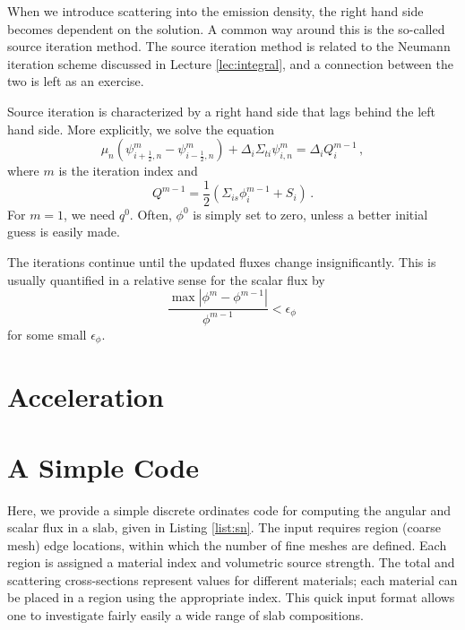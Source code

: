 When we introduce scattering into the emission density, the right hand side becomes dependent on the solution.  A common way around this is the so-called source iteration method.  The source iteration method is related to the Neumann iteration scheme discussed in Lecture \ref{lec:integral}, and a connection between the two is left as an exercise.  

Source iteration is characterized by a right hand side that lags behind the left hand side.  More explicitly, we solve the equation
\begin{equation}
   \mu_n ( \psi^m_{i+\frac{1}{2},n} - \psi^m_{i-\frac{1}{2},n} ) + \Delta_i \Sigma_{ti}\psi^m_{i,n} =  \Delta_i Q^{m-1}_i \, ,
   \label{eq:discsneqsi}
\end{equation}
where $m$ is the iteration index and 
\begin{equation}
 Q^{m-1} = \frac{1}{2} (\Sigma_{is} \phi^{m-1}_i +  S_i) \, .
\end{equation}
For $m=1$, we need $q^0$.  Often, $\phi^0$ is simply set to zero, unless a better initial guess is easily made.  

The iterations continue until the updated fluxes change insignificantly.  This is usually quantified in a relative sense for the scalar flux by
\begin{equation}
 \frac{ \max | \phi^{m}-\phi^{m-1} |}{\phi^{m-1}}  < \epsilon_{\phi} \, 
 \label{eq:siconvergence}
\end{equation}
for some small $\epsilon_{\phi}$.

\section*{Acceleration}


\section*{A Simple Code}

Here, we provide a simple discrete ordinates code for computing the angular and scalar flux in a slab, given in Listing \ref{list:sn}.  The input requires region (coarse mesh) edge locations, within which the number of fine meshes are defined.  Each region is assigned a material index and volumetric source strength.  The total and scattering cross-sections represent values for different materials; each material can be placed in a region using the appropriate index.  This quick input format allows one to investigate fairly easily a wide range of slab compositions.

